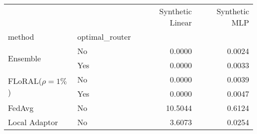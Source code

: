 \begin{tabular}{llrr}
\toprule
 &  & Synthetic Linear & Synthetic MLP \\
method & optimal_router &  &  \\
\midrule
\multirow[t]{2}{*}{Ensemble} & No & 0.0000 & 0.0024 \\
 & Yes & 0.0000 & 0.0033 \\
\cline{1-4}
\multirow[t]{2}{*}{FLoRAL($\rho=1\%$)} & No & 0.0000 & 0.0039 \\
 & Yes & 0.0000 & 0.0047 \\
\cline{1-4}
FedAvg & No & 10.5044 & 0.6124 \\
\cline{1-4}
Local Adaptor & No & 3.6073 & 0.0254 \\
\cline{1-4}
\bottomrule
\end{tabular}
